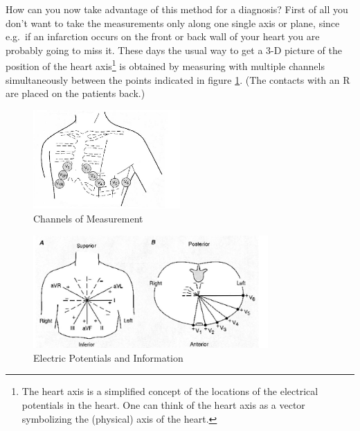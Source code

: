 How can you now take advantage of this method for a diagnosis? First of all you don't want to take the measurements only along one single axis or plane, since e.g.\ if an infarction occurs on the front or back wall of your heart you are probably going to miss it. These days the usual way to get a 3-D picture of the position of the heart axis\footnote{The heart axis is a simplified concept of the locations of the electrical potentials in the heart. One can think of the heart axis as a vector symbolizing the (physical) axis of the heart.} is obtained by measuring with multiple channels simultaneously between the points indicated in figure \ref{fig:channels}. (The contacts with an R are placed on the patients back.) \myskip

\begin{figure}[h]
    \begin{center}
        \includegraphics[width=0.5\textwidth]{./Exp1/pic/image7.png}
    \end{center}
    \caption{Channels of Measurement}
    \label{fig:channels}
\end{figure}

\begin{figure}[h]
    \begin{center}
        \includegraphics[width=0.8\textwidth]{./Exp1/pic/image8.png}
    \end{center}
    \caption{Electric Potentials and Information}
    \label{fig:heartcomp}
\end{figure}

